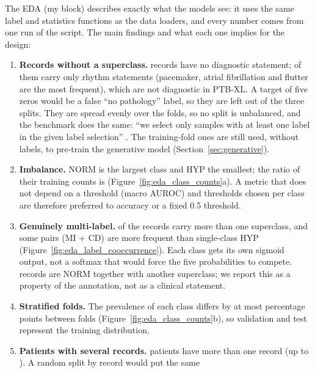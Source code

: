 The EDA (my block) describes exactly what the models see: it uses the same label and statistics
functions as the data loaders, and every number comes from one run of the script. The main findings
and what each one implies for the design:

\begin{enumerate}[leftmargin=1.4em,itemsep=2pt]
  \item \textbf{Records without a superclass.} \edaNNosuperAll{} records have no diagnostic
        statement; \edaNNosuperRhythmOnly{} of them carry only rhythm statements (pacemaker, atrial
        fibrillation and flutter are the most frequent), which are not diagnostic in PTB-XL. A target
        of five zeros would be a false ``no pathology'' label, so they are left out of the three
        splits. They are spread evenly over the folds, so no split is unbalanced, and the benchmark
        does the same: ``we select only samples with at least one label in the given label selection''
        \cite[p.~1523]{strodthoff2021deep}. The training-fold ones are still used, without labels, to
        pre-train the generative model (Section~\ref{sec:generative}).
  \item \textbf{Imbalance.} NORM is the largest class and HYP the smallest; the ratio of their
        training counts is \edaImbalanceRatioTrain{} (Figure~\ref{fig:eda_class_counts}a). A metric
        that does not depend on a threshold (macro AUROC) and thresholds chosen per class are
        therefore preferred to accuracy or a fixed 0.5 threshold.
  \item \textbf{Genuinely multi-label.} \edaFracMultilabelAllPct{} of the records carry more than one
        superclass, and some pairs (MI + CD) are more frequent than single-class HYP
        (Figure~\ref{fig:eda_label_cooccurrence}). Each class gets its own sigmoid output, not a
        softmax that would force the five probabilities to compete. \edaNNormWithOther{} records are
        NORM together with another superclass; we report this as a property of the annotation, not as
        a clinical statement.
  \item \textbf{Stratified folds.} The prevalence of each class differs by at most
        \edaMaxFoldPrevGapPp{} percentage points between folds (Figure~\ref{fig:eda_class_counts}b),
        so validation and test represent the training distribution.
  \item \textbf{Patients with several records.} \edaNPatientsSeveralRecords{} patients have more than
        one record (up to \edaMaxRecordsPerPatient{}). A random split by record would put the same

\end{enumerate}
